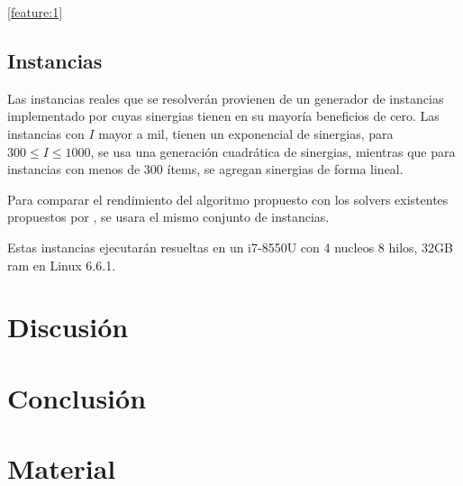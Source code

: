 \documentclass[spanish, a4paper, 12pt, twoside, openany,final]{book}
\numberwithin{equation}{section}                %
\begin{document}
\ref{feature:1}




\section{Instancias}

Las instancias reales que se resolverán provienen de un generador de instancias implementado por \cite{baldo_polynomial_2023} cuyas sinergias tienen en su mayoría beneficios de cero. Las instancias con $I$ mayor a mil, tienen un exponencial de sinergias, para $300 \le I \le 1000$, se usa una generación cuadrática de sinergias, mientras que para instancias con menos de 300 ítems, se agregan sinergias de forma lineal.

Para comparar el rendimiento del algoritmo propuesto con los solvers existentes propuestos por \cite{baldo_polynomial_2023}, se usara el mismo conjunto de instancias.

Estas instancias ejecutarán resueltas en un i7-8550U con 4 nucleos 8 hilos, 32GB ram en Linux 6.6.1.
 
\clearpage

\chapter{Discusión}
    
\clearpage

\chapter{Conclusión}
    
\clearpage

\newpage
\renewcommand\refname{Referencias}          %
{                           %
}

\newpage
\renewcommand{\appendixpagename}{Apéndices}     %

\appendix   %

\chapter{Material}                

\clearpage
\end{document}
